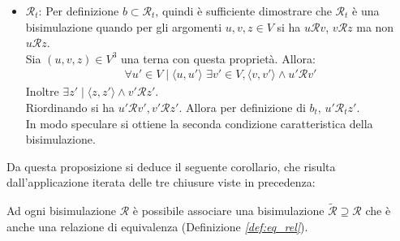 \begin{proof2}
\begin{itemize}
        Sia $(u,v) \in V\times V$. Allora:
        \begin{center}
            $u \mathcal{R}_s v \implies u \mathcal{R} v \lor v \mathcal{R} u$
        \end{center}
        Supponiamo ad esempio che $v \mathcal{R} u$.
        \begin{align*}
            &\implies \forall v' \in V \mid \langle v, v' \rangle \,\,\exists u' \in V, \langle u, u' \rangle \land v' \mathcal{R} u'\\
            &\implies u' \mathcal{R}_s v'
        \end{align*}
        e
        \begin{align*}
            &\implies \forall u' \in V\mid \langle u, u' \rangle \,\,\exists v' \in V, \langle v, v' \rangle \land v' \mathcal{R} u'\\
            &\implies u' \mathcal{R}_s v'
        \end{align*}
        cioè sono dimostrate le due condizioni caratteristiche della bisimulazione.\\
        La dimostrazione è analoga se $u \mathcal{R} v$.
        \item $\mathcal{R}_t$: Per definizione $b \subset \mathcal{R}_t$, quindi è sufficiente dimostrare che $\mathcal{R}_t$ è una bisimulazione quando per gli argomenti $u,v,z \in V$ si ha $u \mathcal{R} v$, $v \mathcal{R} z$ ma non $u \mathcal{R} z$.\\
        Sia $(u,v,z) \in V^3$ una terna con questa proprietà. Allora:
        \begin{gather*}
            \forall u' \in V\mid \langle u, u' \rangle \,\, \exists v' \in V, \langle v, v' \rangle \land u' \mathcal{R} v'
        \end{gather*}
        Inoltre $\exists z' \mid \langle z, z' \rangle \land v' \mathcal{R} z'$.\\
        Riordinando si ha $u' \mathcal{R} v', v' \mathcal{R} z'$. Allora per definizione di $b_t, \, u' \mathcal{R}_t z'$.\\
        In modo speculare si ottiene la seconda condizione caratteristica della bisimulazione.
    \end{itemize}
    \vspace*{-0.75cm}
\end{proof2}

Da questa proposizione si deduce il seguente corollario, che risulta dall'applicazione iterata delle tre chiusure viste in precedenza:
\begin{corollary}
    Ad ogni bisimulazione $\mathcal{R}$ è possibile associare una bisimulazione $\widetilde{\mathcal{R}} \supseteq \mathcal{R}$ che è anche una relazione di equivalenza (Definizione \emph{\ref{def:eq_rel}}).
    \label{cor:bisimulation_eqrel}
\end{corollary}


